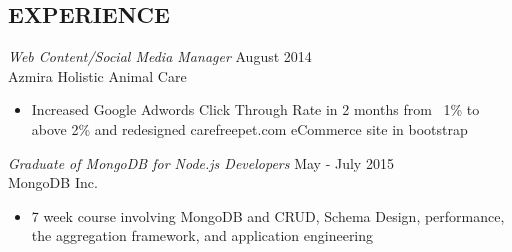 \documentclass[margin]{res}
\begin{document}
\begin{resume}
\section{EXPERIENCE} 

  {\sl Web Content/Social Media Manager} \hfill August 2014 \\
  Azmira Holistic Animal Care
  \begin{itemize}
      \item Increased Google Adwords Click Through Rate in 2 months from ~1\% to above 2\% and redesigned carefreepet.com eCommerce site in bootstrap
  \end{itemize}
  {\sl Graduate of MongoDB for Node.js Developers} \hfill May - July 2015 \\
  MongoDB Inc.
  \begin{itemize}
      \item 7 week course involving MongoDB and CRUD, Schema Design, performance, the aggregation framework, and application engineering
  \end{itemize}



\end{resume}
\end{document}
